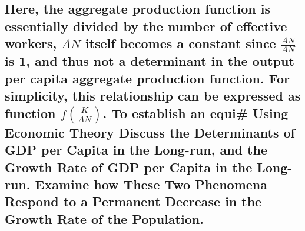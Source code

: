 \documentclass[
]{article}
\begin{document}
\hypertarget{here-the-aggregate-production-function-is-essentially-divided-by-the-number-of-effective-workers-an-itself-becomes-a-constant-since-fracanan-is-1-and-thus-not-a-determinant-in-the-output-per-capita-aggregate-production-function.-for-simplicity-this-relationship-can-be-expressed-as-function-fleft-frackan-right.-to-establish-an-equi-using-economic-theory-discuss-the-determinants-of-gdp-per-capita-in-the-long-run-and-the-growth-rate-of-gdp-per-capita-in-the-long-run.-examine-how-these-two-phenomena-respond-to-a-permanent-decrease-in-the-growth-rate-of-the-population.}{%
\subsection{\texorpdfstring{Here, the aggregate production function is
essentially divided by the number of effective workers, {\(AN\)} itself
becomes a constant since {\(\frac{AN}{AN}\)} is 1, and thus not a
determinant in the output per capita aggregate production function. For
simplicity, this relationship can be expressed as function
{\(f\left( \frac{K}{AN} \right)\)}. To establish an equi\# Using
Economic Theory Discuss the Determinants of GDP per Capita in the
Long-run, and the Growth Rate of GDP per Capita in the Long-run. Examine
how These Two Phenomena Respond to a Permanent Decrease in the Growth
Rate of the
Population.}{Here, the aggregate production function is essentially divided by the number of effective workers, AN itself becomes a constant since \textbackslash frac\{AN\}\{AN\} is 1, and thus not a determinant in the output per capita aggregate production function. For simplicity, this relationship can be expressed as function f\textbackslash left( \textbackslash frac\{K\}\{AN\} \textbackslash right). To establish an equi\# Using Economic Theory Discuss the Determinants of GDP per Capita in the Long-run, and the Growth Rate of GDP per Capita in the Long-run. Examine how These Two Phenomena Respond to a Permanent Decrease in the Growth Rate of the Population.}}\label{here-the-aggregate-production-function-is-essentially-divided-by-the-number-of-effective-workers-an-itself-becomes-a-constant-since-fracanan-is-1-and-thus-not-a-determinant-in-the-output-per-capita-aggregate-production-function.-for-simplicity-this-relationship-can-be-expressed-as-function-fleft-frackan-right.-to-establish-an-equi-using-economic-theory-discuss-the-determinants-of-gdp-per-capita-in-the-long-run-and-the-growth-rate-of-gdp-per-capita-in-the-long-run.-examine-how-these-two-phenomena-respond-to-a-permanent-decrease-in-the-growth-rate-of-the-population.}}
\end{document}
